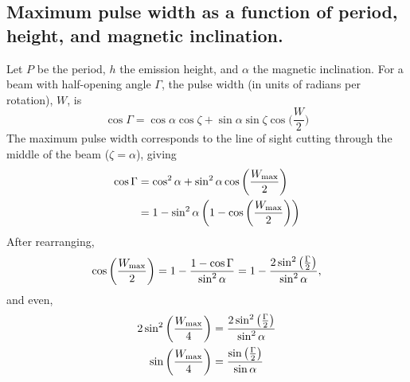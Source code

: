 \documentclass{book}
\begin{document}
\subsection{Maximum pulse width as a function of period, height, and magnetic inclination.}

Let $P$ be the period, $h$ the emission height, and $\alpha$ the magnetic inclination.
For a beam with half-opening angle $\Gamma$, the pulse width (in units of radians per rotation), $W$, is \citep[from spherical geometry, cf.][, Eq. (3.26)]{lorimer2005handbook}
\begin{equation}
  \cos\Gamma
    = \cos\alpha \cos\zeta + \sin\alpha \sin\zeta \cos\bigg(\frac{W}{2}\bigg) 
\end{equation}
The maximum pulse width corresponds to the line of sight cutting through the middle of the beam ($\zeta = \alpha$), giving
\begin{equation}
  \begin{aligned}
    \cos\Gamma
      &= \cos^2\alpha + \sin^2\alpha \cos\bigg(\frac{W_{\rm max}}{2}\bigg) \\
      &= 1 - \sin^2\alpha \left( 1 - \cos\bigg(\frac{W_{\rm max}}{2}\bigg) \right)
  \end{aligned}
  \label{eqn:los_middle_cut}
\end{equation}
After rearranging,
\begin{equation}
  \cos\bigg(\frac{W_{\rm max}}{2}\bigg)
    = 1 - \frac{1 - \cos\Gamma}{\sin^2\alpha}
    = 1 - \frac{2 \sin^2\left(\frac{\Gamma}{2}\right)}{\sin^2\alpha},
  \label{eqn:width-beam-relation} 
\end{equation}
and even,
\begin{equation}
  \begin{aligned}
  2\sin^2\bigg(\frac{W_{\rm max}}{4}\bigg)
    &= \frac{2 \sin^2\left(\frac{\Gamma}{2}\right)}{\sin^2\alpha} \\
  \sin\bigg(\frac{W_{\rm max}}{4}\bigg)
    &= \frac{\sin\left(\frac{\Gamma}{2}\right)}{\sin\alpha}
  \end{aligned}
\end{equation}
\end{document}
